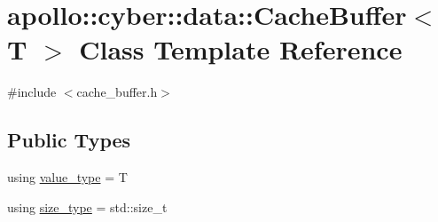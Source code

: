 \hypertarget{classapollo_1_1cyber_1_1data_1_1CacheBuffer}{\section{apollo\-:\-:cyber\-:\-:data\-:\-:Cache\-Buffer$<$ T $>$ Class Template Reference}
\label{classapollo_1_1cyber_1_1data_1_1CacheBuffer}
}


{\ttfamily \#include $<$cache\-\_\-buffer.\-h$>$}

\subsection*{Public Types}
\begin{DoxyCompactItemize}
\item 
using \hyperlink{classapollo_1_1cyber_1_1data_1_1CacheBuffer_a5ecd4f15649a5a8cdfe374728dfc525d}{value\-\_\-type} = T
\item 
using \hyperlink{classapollo_1_1cyber_1_1data_1_1CacheBuffer_aeec34cc7bc656b116ad54e5642c7f9dc}{size\-\_\-type} = std\-::size\-\_\-t
\end{DoxyCompactItemize}
